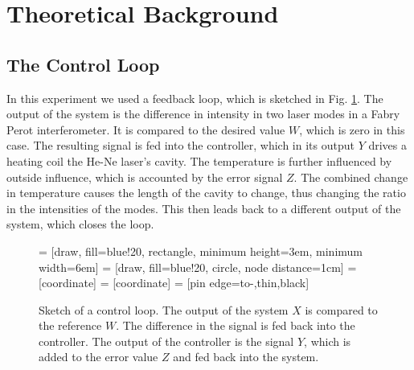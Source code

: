 \documentclass[a4paper,10pt]{article}
\begin{document}
\section{Theoretical Background}
\subsection{The Control Loop}
In this experiment we used a feedback loop, which is sketched in Fig. \ref{fig_control_loop}. The output of the system is the difference in intensity in two laser modes in a Fabry Perot interferometer. It is compared to the desired value $W$, which is zero in this case. The resulting signal is fed into the controller, which in its output $Y$ drives a heating coil the He-Ne laser's cavity. The temperature is further influenced by outside influence, which is accounted by the error signal $Z$. The combined change in temperature causes the length of the cavity to change, thus changing the ratio in the intensities of the modes. This then leads back to a different output of the system, which closes the loop.
\begin{figure}[htp!]
    \centering
     = [draw, fill=blue!20, rectangle,
    minimum height=3em, minimum width=6em]
     = [draw, fill=blue!20, circle, node distance=1cm]
     = [coordinate]
     = [coordinate]
     = [pin edge={to-,thin,black}]

\caption{Sketch of a control loop. The output of the system $X$ is compared to the reference $W$. The difference in the signal is fed back into the controller. The output of the controller is the signal $Y$, which is added to the error value $Z$ and fed back into the system. }
\label{fig_control_loop}
\end{figure}
\end{document}
